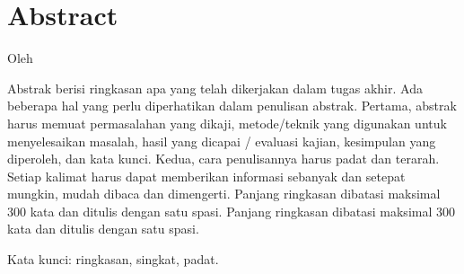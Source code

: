 \chapter*{Abstract}

\begin{center}
	\center
	\begin{doublespace}
		\Large \bfseries \MakeUppercase{\thetitle}

		\normalfont \normalsize
		Oleh

		\theauthor
	\end{doublespace}
\end{center}

\begin{singlespace}
	Abstrak berisi ringkasan apa yang telah dikerjakan dalam tugas akhir. Ada
	beberapa hal yang perlu diperhatikan dalam penulisan abstrak. Pertama,
	abstrak harus memuat permasalahan yang dikaji, metode/teknik yang digunakan
	untuk menyelesaikan masalah, hasil yang dicapai / evaluasi kajian,
	kesimpulan yang diperoleh, dan kata kunci. Kedua, cara penulisannya harus
	padat dan terarah. Setiap kalimat harus dapat memberikan informasi sebanyak
	dan setepat mungkin, mudah dibaca dan dimengerti. Panjang ringkasan dibatasi
	maksimal 300 kata dan ditulis dengan satu spasi. Panjang ringkasan dibatasi
	maksimal 300 kata dan ditulis dengan satu spasi.

	Kata kunci: ringkasan, singkat, padat.
\end{singlespace}

\clearpage
